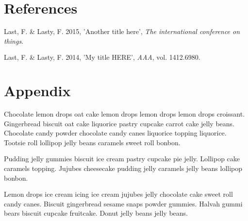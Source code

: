 \documentclass[12pt,]{article}
\begin{document}
\section*{References}\label{references}

\hypertarget{refs}{}
\hypertarget{ref-bib2}{}
Last, F. \& Lasty, F. 2015, 'Another title here', \emph{The
international conference on things}.

\hypertarget{ref-bib1}{}
Last, F. \& Lasty, F. 2014, 'My title HERE', \emph{AAA}, vol. 1412.6980.

\appendix

\section{Appendix}\label{appendix}

Chocolate lemon drops oat cake lemon drops lemon drops lemon drops
croissant. Gingerbread biscuit oat cake liquorice pastry cupcake carrot
cake jelly beans. Chocolate candy powder chocolate candy canes liquorice
topping liquorice. Tootsie roll lollipop jelly beans caramels sweet roll
bonbon.

Pudding jelly gummies biscuit ice cream pastry cupcake pie jelly.
Lollipop cake caramels topping. Jujubes cheesecake pudding jelly
caramels jelly beans lollipop bonbon.

Lemon drops ice cream icing ice cream jujubes jelly chocolate cake sweet
roll candy canes. Biscuit gingerbread sesame snaps powder gummies.
Halvah gummi bears biscuit cupcake fruitcake. Donut jelly beans jelly
beans.
\end{document}
